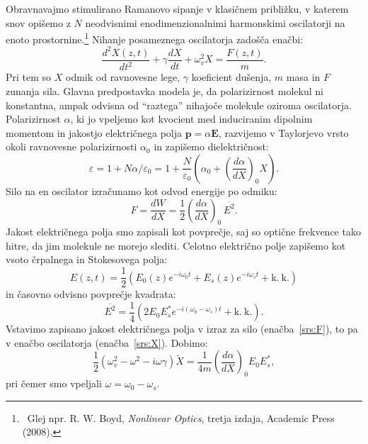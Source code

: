 Obravnavajmo stimulirano Ramanovo sipanje v klasičnem približku, v katerem snov opišemo 
z $N$ neodvisnimi enodimenzionalnimi harmonskimi oscilatorji na enoto prostornine.\footnote{~Glej npr. 
R. W. Boyd, {\it Nonlinear Optics}, tretja izdaja, Academic Press (2008).} Nihanje
posameznega oscilatorja zadošča enačbi:
\begin{equation}
\frac{d^2X(z,t)}{dt^2}+ \gamma \frac{dX}{dt}+\omega_v^2X = \frac{F(z,t)}{m}.
\label{srs:X}
\end{equation}
Pri tem so $X$ odmik od ravnovesne lege, $\gamma$ koeficient dušenja, $m$ masa in $F$ zunanja sila.
Glavna predpostavka modela je, da polarizirnost molekul ni konstantna, ampak odvisna od 
``raztega'' nihajoče molekule oziroma oscilatorja. Polarizirnost $\alpha$, ki jo vpeljemo
kot kvocient med induciranim dipolnim momentom in jakostjo električnega polja $\mathbf{p} = \alpha \mathbf{E}$,
razvijemo v Taylorjevo vrsto okoli ravnovesne polarizirnosti  $\alpha_0$   in zapišemo dielektričnost:
\begin{equation}
\varepsilon = 1+N\alpha/\varepsilon_0 = 1+\frac{N}{\varepsilon_0}\left(\alpha_0 + \left(\frac{d\alpha}{dX}\right) _0 X\right)\!\!.
\label{srs:a}
\end{equation}
Silo na en oscilator izračunamo kot odvod energije po odmiku:
\begin{equation}
F = \frac{dW}{dX}= \frac{1}{2}\left(\frac{d\alpha}{dX}\right)_0\,\overline{E^2}.
\label{srs:F}
\end{equation}
Jakost električnega polja smo zapisali kot povprečje, saj so optične frekvence 
tako hitre, da jim molekule ne morejo slediti. 
Celotno električno polje zapišemo kot vsoto črpalnega in Stokesovega polja:
\begin{equation}
E(z,t)= \frac{1}{2}\left( E_0(z)e^{-i\omega_0t}+ E_s(z)e^{-i\omega_st} + \mathrm{k.~k.}\right)
\label{eq:srsE}
\end{equation}
in časovno odvisno povprečje kvadrata:
\begin{equation}
\overline{E^2} = \frac{1}{4}\left(2E_0E_s^* e^{-i(\omega_0-\omega_s)t}+\mathrm{k.~k.}\right)\!\!.
\end{equation}
Vstavimo zapisano jakost električnega polja v izraz za silo (enačba~\ref{srs:F}),
to pa v enačbo oscilatorja (enačba~\ref{srs:X}). Dobimo:
\begin{equation}
\frac{1}{2}\left(\omega_v^2-\omega^2-i\omega\gamma\right)\tilde{X} = 
\frac{1}{4m}\left(\frac{d\alpha}{dX}\right)_0 E_0 E_s^*,
\end{equation}
pri čemer smo vpeljali $\omega = \omega_0-\omega_s$. 

